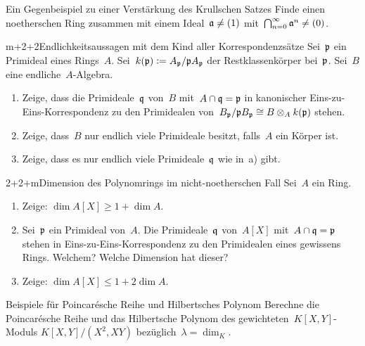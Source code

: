 \documentclass{uebblatt}
\begin{document}

\begin{aufgabe}{2}{Ein Gegenbeispiel zu einer Verstärkung des Krullschen Satzes}
Finde einen noetherschen Ring zusammen mit einem Ideal~$\mathfrak{a} \neq (1)$
mit~$\bigcap_{n=0}^\infty \mathfrak{a}^n \neq (0)$.
\end{aufgabe}

\begin{aufgabe}{m+2+2}{Endlichkeitsaussagen mit dem Kind aller Korrespondenzsätze}
Sei~$\mathfrak{p}$ ein Primideal eines Rings~$A$. Sei~$k(\mathfrak{p}) \vcentcolon= A_{\mathfrak{p}}/\mathfrak{p} A_{\mathfrak{p}}$
der Restklassenkörper bei~$\mathfrak{p}$. Sei~$B$ eine endliche~$A$-Algebra.
\begin{enumerate}
\item Zeige, dass die Primideale~$\mathfrak{q}$
von~$B$ mit~$A \cap \mathfrak{q} = \mathfrak{p}$ in kanonischer Eins-zu-Eins-Korrespondenz zu
den Primidealen von~$B_{\mathfrak{p}}/\mathfrak{p} B_{\mathfrak{p}} \cong B \otimes_A k(\mathfrak{p})$ stehen.
\item Zeige, dass~$B$ nur endlich
viele Primideale besitzt, falls~$A$ ein Körper ist.
\item Zeige, dass es nur endlich viele
Primideale~$\mathfrak{q}$ wie in~a) gibt.
\end{enumerate}
\end{aufgabe}

\begin{aufgabe}{2+2+m}{Dimension des Polynomrings im nicht-noetherschen Fall}
Sei~$A$ ein Ring.
\begin{enumerate}
\item Zeige: $\dim A[X] \geq 1 + \dim A$.
\item Sei~$\mathfrak{p}$ ein Primideal von~$A$. Die Primideale~$\mathfrak{q}$
von~$A[X]$ mit~$A \cap \mathfrak{q} = \mathfrak{p}$ stehen in Eins-zu-Eins-Korrespondenz zu den
Primidealen eines gewissens Rings. Welchem? Welche Dimension hat dieser?
\item Zeige: $\dim A[X] \leq 1 + 2 \dim A$.
\end{enumerate}
\end{aufgabe}

\begin{aufgabe}{3}{Beispiele für Poincarésche Reihe und Hilbertsches Polynom}
Berechne die Poincarésche Reihe und das Hilbertsche Polynom des
gewichteten~$K[X,Y]$-Moduls $K[X,Y]/(X^2, XY)$ bezüglich~$\lambda = \dim_K$.
\end{aufgabe}
\end{document}
